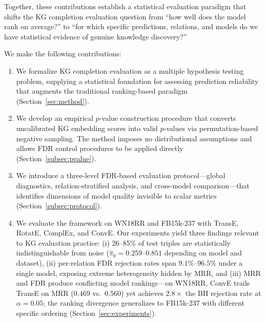 Together, these contributions establish a statistical evaluation paradigm that shifts the KG completion evaluation question from ``how well does the model rank on average?'' to ``for which specific predictions, relations, and models do we have statistical evidence of genuine knowledge discovery?''

We make the following contributions:

\begin{enumerate}
    \item We formalize KG completion evaluation as a multiple hypothesis testing problem, supplying a statistical foundation for assessing prediction reliability that augments the traditional ranking-based paradigm (Section~\ref{sec:method}).

    \item We develop an empirical $p$-value construction procedure that converts uncalibrated KG embedding scores into valid $p$-values via permutation-based negative sampling. The method imposes no distributional assumptions and allows FDR control procedures to be applied directly (Section~\ref{subsec:pvalue}).

    \item We introduce a three-level FDR-based evaluation protocol---global diagnostics, relation-stratified analysis, and cross-model comparison---that identifies dimensions of model quality invisible to scalar metrics (Section~\ref{subsec:protocol}).

    \item We evaluate the framework on WN18RR and FB15k-237 with TransE, RotatE, ComplEx, and ConvE. Our experiments yield three findings relevant to KG evaluation practice: (i) 26--85\% of test triples are statistically indistinguishable from noise ($\hat{\pi}_0 = 0.259$--$0.851$ depending on model and dataset), (ii) per-relation FDR rejection rates span $9.1\%$--$96.5\%$ under a single model, exposing extreme heterogeneity hidden by MRR, and (iii) MRR and FDR produce conflicting model rankings---on WN18RR, ConvE trails TransE on MRR ($0.469$ vs.\ $0.560$) yet achieves $2.8\times$ the BH rejection rate at $\alpha = 0.05$; the ranking divergence generalizes to FB15k-237 with different specific ordering (Section~\ref{sec:experiments}).
\end{enumerate}
